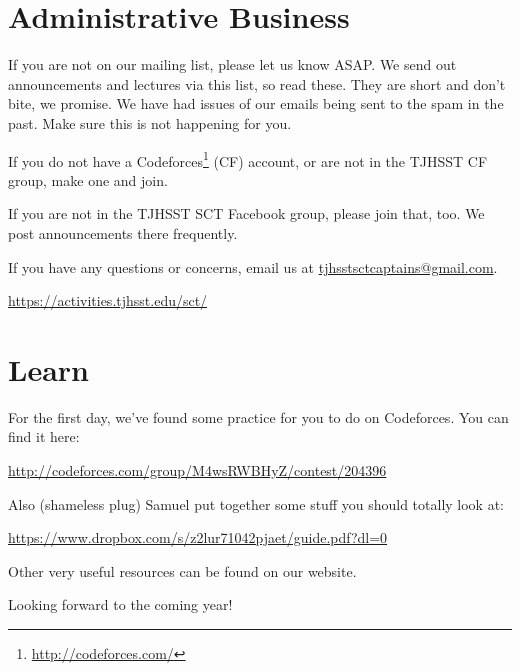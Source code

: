 \documentclass{article}
\begin{document}
\section{Administrative Business}

If you are not on our mailing list, please let us know ASAP.  We send out announcements and lectures via this list, so read these. They are short and don't bite, we promise. We have had issues of our emails being sent to the spam in the past. Make sure this is not happening for you.

If you do not have a Codeforces\footnote{\url{http://codeforces.com/}} (CF) account, or are not in the TJHSST CF group, make one and join.

If you are not in the TJHSST SCT Facebook group, please join that, too. We post announcements there frequently.

If you have any questions or concerns, email us at \url{tjhsstsctcaptains@gmail.com}.

\begin{center}
\Large{\url{https://activities.tjhsst.edu/sct/}}
\end{center}

\eject

\section{Learn}

For the first day, we've found some practice for you to do on Codeforces. You can find it here:

\begin{center}
\Large{\url{http://codeforces.com/group/M4wsRWBHyZ/contest/204396}}
\end{center}

Also (shameless plug) Samuel put together some stuff you should totally look at:

\begin{center}
\Large{\url{https://www.dropbox.com/s/z2lur71042pjaet/guide.pdf?dl=0}}
\end{center}

Other very useful resources can be found on our website.

Looking forward to the coming year!
\end{document}

